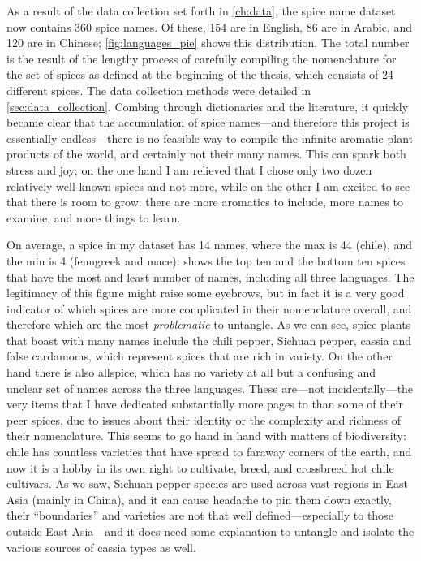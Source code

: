 As a result of the data collection set forth in \cref{ch:data}, the spice name dataset now contains 360 spice names. Of these, 154 are in English, 86 are in Arabic, and 120 are in Chinese; \cref{fig:languages_pie} shows this distribution.
The total number is the result of the lengthy process of carefully compiling the nomenclature for the set of spices as defined at the beginning of the thesis, which consists of 24 different spices. The data collection methods were detailed in \cref{sec:data_collection}. Combing through dictionaries and the literature, it quickly became clear that the accumulation of spice names---and therefore this project is essentially endless---there is no feasible way to compile the infinite aromatic plant products of the world, and certainly not their many names. This can spark both stress and joy; on the one hand I am relieved that I chose only two dozen relatively well-known spices and not more, while on the other I am excited to see that there is room to grow: there are more aromatics to include, more names to examine, and more things to learn.
 
On average, a spice in my dataset has 14 names, where the max is 44 (chile), and the min is 4 (fenugreek and mace).  shows the top ten and the bottom ten spices that have the most and least number of names, including all three languages. The legitimacy of this figure might raise some eyebrows, but in fact it is a very good indicator of which spices are more complicated in their nomenclature overall, and therefore which are the most \textit{problematic} to untangle. As we can see, spice plants that boast with many names include the chili pepper, Sichuan pepper, cassia and false cardamoms, which represent spices that are rich in variety. On the other hand there is also allspice, which has no variety at all but a confusing and unclear set of names across the three languages. These are---not incidentally---the very items that I have dedicated substantially more pages to than some of their peer spices, due to issues about their identity or the complexity and richness of their nomenclature. This seems to go hand in hand with matters of biodiversity: chile has countless varieties that have spread to faraway corners of the earth, and now it is a hobby in its own right to cultivate, breed, and crossbreed hot chile cultivars. As we saw, Sichuan pepper species are used across vast regions in East Asia (mainly in China), and it can cause headache to pin them down exactly, their ``boundaries'' and varieties are not that well defined---especially to those outside East Asia---and it does need some explanation to untangle and isolate the various sources of cassia types as well.

